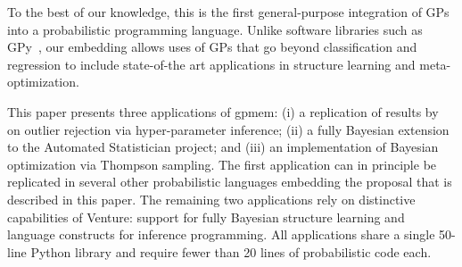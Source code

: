 To the best of our knowledge, this is the first general-purpose integration of
\acsp{GP} into a probabilistic programming language. Unlike software
libraries such as GPy~\citep{gpy2014}, our embedding allows uses of GPs that go beyond classification and regression to include state-of-the art applications in structure learning and meta-optimization.

This paper presents three applications of gpmem: (i) a replication of results by~\citet{neal1997monte} on outlier rejection via hyper-parameter inference; (ii) a fully Bayesian extension to the Automated Statistician project; and (iii) an implementation of Bayesian optimization via Thompson sampling. The first application can in principle be replicated in several other probabilistic languages embedding the proposal that is described in this paper. The remaining two applications rely on distinctive capabilities of Venture: support for fully Bayesian structure learning and language constructs for inference programming. All applications share a single 50-line Python library and require fewer than 20 lines of probabilistic code each.



